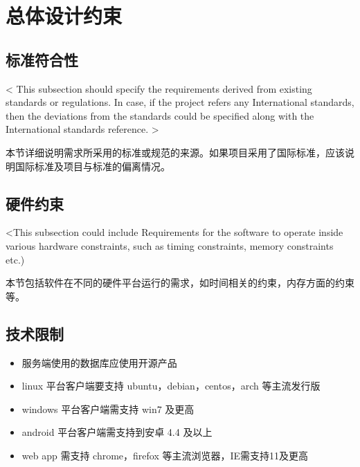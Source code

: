 \chapter{总体设计约束}

 
\section{标准符合性}
< This subsection should specify the requirements derived from existing standards or regulations. In case, if the project refers any International standards, then the deviations from the standards could be specified along with the International standards reference. >

本节详细说明需求所采用的标准或规范的来源。如果项目采用了国际标准，应该说明国际标准及项目与标准的偏离情况。

\section{硬件约束}
<This subsection could include Requirements for the software to operate inside various hardware constraints, such as timing constraints, memory constraints etc.)

本节包括软件在不同的硬件平台运行的需求，如时间相关的约束，内存方面的约束等。


\section{技术限制}


\begin{itemize}
    \item 服务端使用的数据库应使用开源产品
    \item linux 平台客户端要支持 ubuntu，debian，centos，arch 等主流发行版
    \item windows 平台客户端需支持 win7 及更高
    \item android 平台客户端需支持到安卓 4.4 及以上
    \item web app 需支持 chrome，firefox 等主流浏览器，IE需支持11及更高
    \end{itemize}